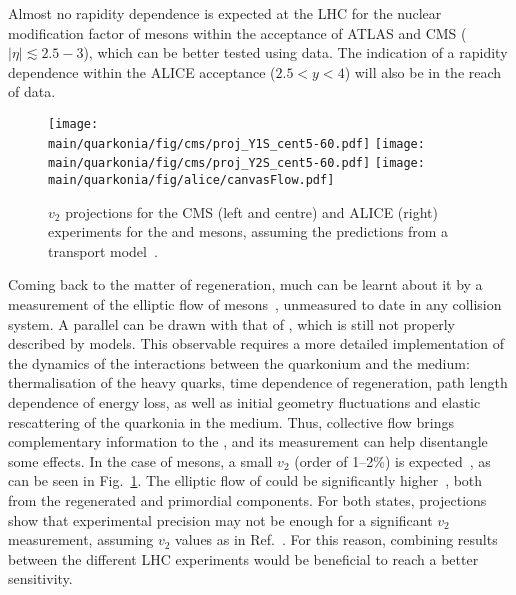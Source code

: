 \documentclass[../report.tex]{subfiles}
\providecommand{\main}{..}
\begin{document}
Almost no rapidity dependence is expected at the LHC for the nuclear modification factor of \PGU mesons within the acceptance of ATLAS and CMS ($|\eta|\lesssim 2.5-3$), which can be better
tested using \RunsThreeFour data. 
The indication of a rapidity dependence within the ALICE acceptance ($2.5<y<4$) will also be in the reach of \RunsThreeFour data. 



\begin{figure}
\begin{center}
 \texttt{[image: \\main/quarkonia/fig/cms/proj\_Y1S\_cent5-60.pdf]}
 \texttt{[image: \\main/quarkonia/fig/cms/proj\_Y2S\_cent5-60.pdf]}
 \texttt{[image: \\main/quarkonia/fig/alice/canvasFlow.pdf]}
\end{center}

 \caption{$v_2$ projections for the CMS (left and centre) and ALICE (right) experiments for the  and  mesons, assuming the predictions from a transport model~\cite{Du:2017qkv}.}
 \label{fig:upsi_v2}
\end{figure}

Coming back to the matter of regeneration, much can be learnt about it by a measurement of the elliptic flow of  mesons~\cite{Das:2018xel}, 
unmeasured to date in any collision system. 
A parallel can be
drawn with that of \PJgy, which is still not properly described by models. This observable requires a more detailed implementation of the dynamics of the interactions between the 
quarkonium and the medium: thermalisation of the heavy quarks, time dependence of regeneration, path length dependence of energy loss, as well as initial geometry fluctuations and 
elastic rescattering of the quarkonia in the medium. Thus, collective flow brings complementary information to the \raa, and its measurement can help disentangle some
effects. In the case of  mesons, a small $v_2$ (order of 1--2\%) is expected~\cite{Du:2017qkv,Yao:2018zrg,Bhaduri:2018iwr}, as can be seen in Fig.~\ref{fig:upsi_v2}.%
The elliptic flow of  could be significantly higher~\cite{Du:2017qkv,Bhaduri:2018iwr}, both from the regenerated and primordial
components. For both states, projections show that experimental precision may not be enough for a significant $v_2$ measurement, assuming $v_2$ values as in Ref.~\cite{Du:2017qkv}. For this reason,
combining results between the different LHC experiments would be beneficial to reach a better sensitivity.
\end{document}
